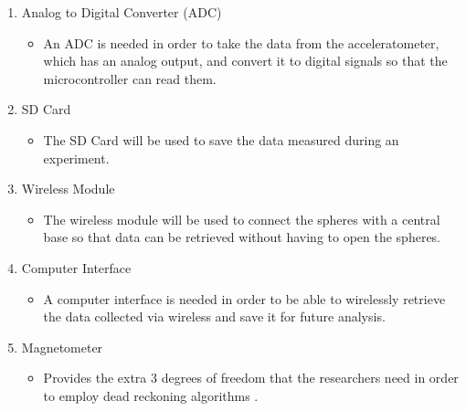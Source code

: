 \begin{enumerate}
\begin{itemize}
\end{itemize}
\item Analog to Digital Converter (ADC)
\begin{itemize}
\item An ADC is needed in order to take the data from the acceleratometer, which has an analog output, and convert it to digital signals so that the microcontroller can read them.
\end{itemize}
\item SD Card
\begin{itemize}
\item The SD Card will be used to save the data measured during an experiment.
\end{itemize}
\item Wireless Module
\begin{itemize}
\item The wireless module will be used to connect the spheres with a central base so that data can be retrieved without having to open the spheres.
\end{itemize}
\item Computer Interface
\begin{itemize}
\item A computer interface is needed in order to be able to wirelessly retrieve the data collected via wireless and save it for future analysis. 
\end{itemize}

\item Magnetometer
\begin{itemize}
\item Provides the extra 3 degrees of freedom that the researchers need in order to employ dead reckoning algorithms \cite{Canals2012}.
\end{itemize}
\end{enumerate}
